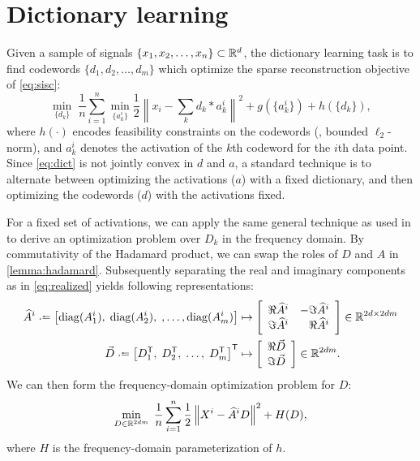 \documentclass{article} %
\begin{document}
\section{Dictionary learning}
\label{sec:dict}
Given a sample of signals $\{x_1, x_2, \dots, x_n\} \subset \mathbb{R}^d$, the dictionary
learning task is to find codewords $\{d_1, d_2, \dots, d_m\}$ which optimize the sparse
reconstruction objective of \eqref{eq:sisc}:
\begin{equation}
\min_{\{d_k\}}\;\frac{1}{n} \sum_{i=1}^n \min_{\{a^i_k\}} \frac{1}{2} \left\|x_i - \sum_k d_k
* a^i_k\right\|^2 + g(\{a^i_k\}) + h(\{d_k\}),\label{eq:dict}
\end{equation}
where $h(\cdot)$ encodes feasibility constraints on the codewords (\eg, bounded
$\ell_2$-norm), and $a_k^i$ denotes the activation of the
$k$th codeword for the $i$th data point.  
Since \eqref{eq:dict} is not jointly convex in $d$ and $a$, a standard technique is to
alternate between optimizing the activations ($a$) with a fixed dictionary, and then
optimizing the codewords ($d$) with the activations fixed.

For a fixed set of activations, we can apply the same general technique as used in
 to derive an optimization problem over $D_k$ in the frequency
domain.  By commutativity of the Hadamard product, we can swap the roles of $D$ and $A$
in \cref{lemma:hadamard}.  Subsequently separating the real and imaginary components as
in \eqref{eq:realized} yields following representations:
\begin{align}
\widehat{A}^i \defeq \left[ \diag(A^i_1),\; \diag(A^i_2),\;, \dots,
\diag(A^i_m)\right] &\mapsto \left[\begin{array}{rr}
\Re \widehat{A}^i & -\Im \widehat{A}^i\\
\Im \widehat{A}^i & \Re\widehat{A}^i\end{array} \right] \in \R^{2d\times
2dm}\notag
\\
\vec{D} \defeq \left[D_1\trans,\; D_2\trans, \; \dots, \; D_m\trans\right]\trans
&\mapsto \left[\begin{array}{r}\Re \vec{D}\\ \Im\vec{D}\end{array} \right]\in \R^{2dm}.
\label{eq:realized-dict}
\end{align}
We can then form the frequency-domain optimization problem for $D$:
\begin{equation}
\min_{D \in \mathbb{R}^{2dm}}\; \frac{1}{n}\sum_{i=1}^n \frac{1}{2} \left\|X^i - \widehat{A}^i D
\right\|^2 + H(D),\label{eq:freqdict}
\end{equation}
where $H$ is the frequency-domain parameterization of $h$.
\end{document}
